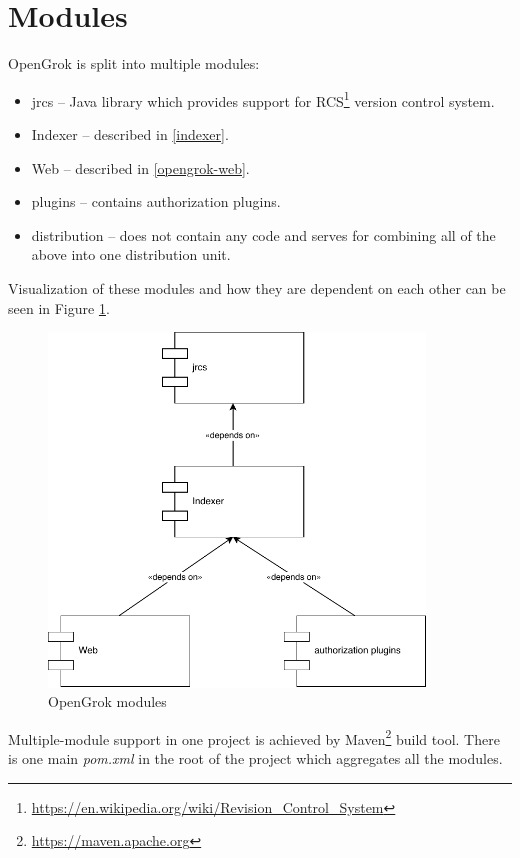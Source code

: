 \section{Modules}
\label{opengrok_modules}

OpenGrok is split into multiple modules:
\begin{itemize}
    \item jrcs – Java library which provides support for RCS\footnote{\url{https://en.wikipedia.org/wiki/Revision\_Control\_System}}
    version control system.
    \item Indexer – described in \ref{indexer}.
    \item Web – described in \ref{opengrok-web}.
    \item plugins – contains authorization plugins.
    \item distribution – does not contain any code and serves for combining all of the above into one distribution unit.
\end{itemize}

Visualization of these modules and how they are dependent on each other can be seen in Figure \ref{opengrok_modules_img}.
\begin{figure}[htbp]
\centering
\includegraphics[width=100mm]{../img/opengrok_modules.pdf}
\caption{OpenGrok modules}
\label{opengrok_modules_img}
\end{figure}

Multiple-module support in one project is achieved by Maven\footnote{\url{https://maven.apache.org}} build tool.
There is one main \textit{pom.xml} in the root of the project which aggregates all the modules.

